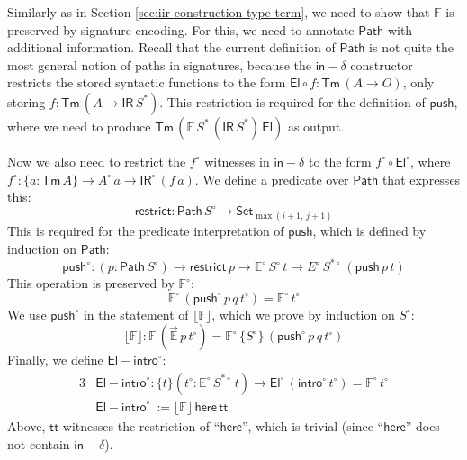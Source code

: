 \documentclass[acmsmall,screen,review]{acmart}
\newcommand{\msf}[1]{{\mathsf{#1}}}
\newcommand{\mbb}[1]{\mathbb{#1}}
\newcommand{\push}{\mathsf{push}}
\newcommand{\Set}{\msf{Set}}
\newcommand{\El}{\msf{El}}
\newcommand{\ttt}{\msf{tt}}
\newcommand{\IR}{\msf{IR}}
\newcommand{\intro}{\msf{intro}}
\newcommand{\floord}[1]{\lfloor #1 \rfloor}
\newcommand{\ora}[1]{\overrightarrow{#1}}
\newcommand{\Tm}{\msf{Tm}}
\newcommand{\w}{\circ}
\newcommand{\Path}{\msf{Path}}
\newcommand{\here}{\msf{here}}
\newcommand{\indelta}{\msf{in}\!\!-\!\!\delta}
\newcommand{\Elintro}{\msf{El\!\!-\!\!intro}}
\newcommand{\E}{\mbb{E}}
\newcommand{\F}{\mbb{F}}
\begin{document}
\begin{definition}[Interpretation of $\Elintro$]\label{sec:canonicity-elintro}
Similarly as in Section \ref{sec:iir-construction-type-term}, we need to show that $\F$ is preserved
by signature encoding. For this, we need to annotate $\Path$ with additional information. Recall
that the current definition of $\Path$ is not quite the most general notion of paths in signatures,
because the $\indelta$ constructor restricts the stored syntactic functions to the form $\El \circ f
: \Tm\,(A \to O)$, only storing $f : \Tm\,(A \to \IR\,S^*)$. This restriction is required for the
definition of $\push$, where we need to produce $\Tm\,(\E\,S^*\,(\IR\,S^*)\,\El)$ as output.

Now we also need to restrict the $f^\w$ witnesses in $\indelta$ to the form $f^\w \circ \El^\w$,
where $f^\w : \{a : \Tm\,A\} \to A^\w\,a \to \IR^\w\,(f\,a)$. We define a predicate over $\Path$
that expresses this:
\[ \msf{restrict} : \Path\,S^\w \to \Set_{\max(i+1,\,j+1)} \]
This is required for the predicate interpretation of $\push$, which is defined by induction on $\Path$:
\[ \push^\w : (p : \Path\,S^\w) \to \msf{restrict}\,p \to \E^\w\,S^\w\,t \to E^\w\,S^{*\w}\,(\push\,p\,t) \]
This operation is preserved by $\F^\w$:
\[ \F^\w\,(\push^\w\,p\,q\,t^\w) = \F^\w\,t^\w \]
We use $\push^\w$ in the statement of $\floord{\F}$, which we prove by induction on
$S^\w$:
\[ \floord{\F} : \F\,(\ora{\E}\,p\,t^\w) = \F^\w\,\{S^\w\}\,(\push^\w\,p\,q\,t^\w) \]
Finally, we define $\Elintro^\w$:
\begin{alignat*}{3}
    &\Elintro^\w : \{t\}(t^\w : \E^\w\,S^{*\w}\,t) \to \El^\w\,(\intro^\w\,t^\w) = \F^\w\,t^\w\\
    &\Elintro^\w\ := \floord{\F}\,\here\,\ttt
\end{alignat*}
Above, $\ttt$ witnesses the restriction of ``$\here$'', which is trivial (since ``$\here$'' does not contain $\indelta$).
\end{definition}
\end{document}
